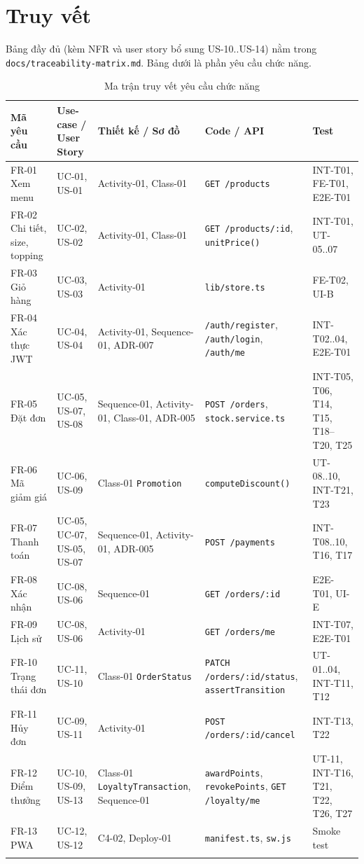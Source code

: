 \documentclass[a4paper]{article}
\newcommand{\st}[1]{\texttt{#1}}
\begin{document}
\section{Truy vết}
Bảng đầy đủ (kèm NFR và user story bổ sung US-10..US-14) nằm trong \st{docs/traceability-matrix.md}. Bảng dưới là phần yêu cầu chức năng.

{\small
\begin{longtable}{|L{2.2cm}|L{2.5cm}|L{3cm}|L{3.7cm}|L{2.9cm}|}
\hline
\textbf{Mã yêu cầu} & \textbf{Use-case / User Story} & \textbf{Thiết kế / Sơ đồ} & \textbf{Code / API} & \textbf{Test} \\ \hline
\endhead
FR-01 Xem menu & UC-01, US-01 & Activity-01, Class-01 & \st{GET /products} & INT-T01, FE-T01, E2E-T01 \\ \hline
FR-02 Chi tiết, size, topping & UC-02, US-02 & Activity-01, Class-01 & \st{GET /products/:id}, \st{unitPrice()} & INT-T01, UT-05..07 \\ \hline
FR-03 Giỏ hàng & UC-03, US-03 & Activity-01 & \st{lib/store.ts} & FE-T02, UI-B \\ \hline
FR-04 Xác thực JWT & UC-04, US-04 & Activity-01, Sequence-01, ADR-007 & \st{/auth/register}, \st{/auth/login}, \st{/auth/me} & INT-T02..04, E2E-T01 \\ \hline
FR-05 Đặt đơn & UC-05, US-07, US-08 & Sequence-01, Activity-01, Class-01, ADR-005 & \st{POST /orders}, \st{stock.service.ts} & INT-T05, T06, T14, T15, T18--T20, T25 \\ \hline
FR-06 Mã giảm giá & UC-06, US-09 & Class-01 \st{Promotion} & \st{computeDiscount()} & UT-08..10, INT-T21, T23 \\ \hline
FR-07 Thanh toán & UC-05, UC-07, US-05, US-07 & Sequence-01, Activity-01, ADR-005 & \st{POST /payments} & INT-T08..10, T16, T17 \\ \hline
FR-08 Xác nhận & UC-08, US-06 & Sequence-01 & \st{GET /orders/:id} & E2E-T01, UI-E \\ \hline
FR-09 Lịch sử & UC-08, US-06 & Activity-01 & \st{GET /orders/me} & INT-T07, E2E-T01 \\ \hline
FR-10 Trạng thái đơn & UC-11, US-10 & Class-01 \st{OrderStatus} & \st{PATCH /orders/:id/status}, \st{assertTransition} & UT-01..04, INT-T11, T12 \\ \hline
FR-11 Hủy đơn & UC-09, US-11 & Activity-01 & \st{POST /orders/:id/cancel} & INT-T13, T22 \\ \hline
FR-12 Điểm thưởng & UC-10, US-09, US-13 & Class-01 \st{LoyaltyTransaction}, Sequence-01 & \st{awardPoints}, \st{revokePoints}, \st{GET /loyalty/me} & UT-11, INT-T16, T21, T22, T26, T27 \\ \hline
FR-13 PWA & UC-12, US-12 & C4-02, Deploy-01 & \st{manifest.ts}, \st{sw.js} & Smoke test \\ \hline
\caption{Ma trận truy vết yêu cầu chức năng}
\end{longtable}
}
\end{document}

